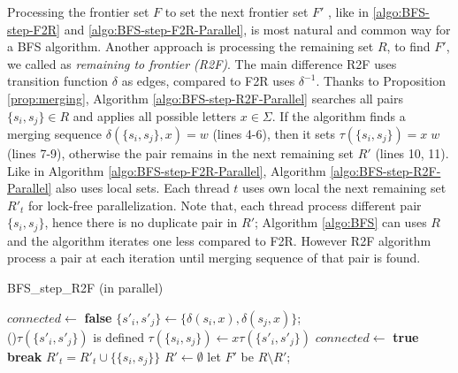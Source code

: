 \documentclass[12pt]{article}
\begin{document}
Processing the frontier set $F$ to set the next frontier set $F'$ , like in \ref{algo:BFS-step-F2R} and \ref{algo:BFS-step-F2R-Parallel}, is most natural and common way for a BFS algorithm. Another approach is processing the remaining set $R$, to find $F'$, we called as \textit{remaining to frontier (R2F)}. The main difference R2F uses transition function $\delta$ as edges, compared to F2R uses $\delta^{-1}$. Thanks to Proposition \ref{prop:merging}, Algorithm \ref{algo:BFS-step-R2F-Parallel} searches all pairs $\{ s_i,s_j \}\in R$ and applies all possible letters $x \in \Sigma$. If the algorithm finds a merging sequence $\delta(\{ s_i,s_j \}, x) = w$ (lines 4-6), then it sets $\tau(\{ s_i,s_j \}) = x \; w$ (lines 7-9), otherwise the pair remains in the next remaining set $R'$ (lines 10, 11). Like in Algorithm \ref{algo:BFS-step-F2R-Parallel}, Algorithm \ref{algo:BFS-step-R2F-Parallel} also uses local sets. Each thread $t$ uses own local the next remaining set $R'_t$ for lock-free parallelization. Note that, each thread process different pair $\{ s_i,s_j \}$, hence there is no duplicate pair in $R'$; Algorithm \ref{algo:BFS} can uses $R$ and the algorithm iterates one less compared to F2R. However R2F algorithm process a pair at each iteration until merging sequence of that pair is found.

\begin{algorithm}[ht]
	\caption{BFS\_step\_R2F (in parallel)}
	\label{algo:BFS-step-R2F-Parallel}
	
	
		{
			$connected  \longleftarrow $ {\bf false}\;
			{
				$\{ s'_i, s'_j \}\longleftarrow \{ \delta(s_i,x),\delta(s_j,x) \}$; \\ 

				\If(){$\tau(\{ s'_i, s'_j \})$ is defined}
				{
					$\tau( \{ s_i, s_j\}) \longleftarrow x \tau(\{ s'_i, s'_j \})$\;
					$connected  \longleftarrow $ {\bf true}\;
					{\bf break}\;
				}
			}
			{
					$R'_t = R'_t \cup \{ \{ s_i, s_j \} \} $\;
			}
		}
		$R' \longleftarrow \emptyset$\;
		let $F'$ be $R \setminus R'$;
\end{algorithm}
\end{document}
